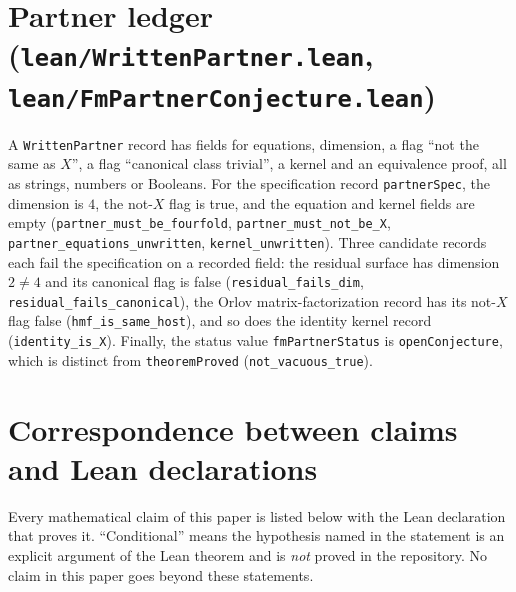 \documentclass[11pt]{amsart}
\theoremstyle{definition}
\theoremstyle{remark}
\begin{document}
\section{Partner ledger (\texttt{lean/WrittenPartner.lean}, \texttt{lean/FmPartnerConjecture.lean})}
A \texttt{WrittenPartner} record has fields for equations, dimension, a flag ``not the same as $X$'', a flag ``canonical class trivial'', a kernel and an equivalence proof, all as strings, numbers or Booleans. For the specification record \texttt{partnerSpec}, the dimension is $4$, the not-$X$ flag is true, and the equation and kernel fields are empty (\texttt{partner\_must\_be\_fourfold}, \texttt{partner\_must\_not\_be\_X}, \texttt{partner\_equations\_unwritten}, \texttt{kernel\_unwritten}). Three candidate records each fail the specification on a recorded field: the residual surface has dimension $2\ne4$ and its canonical flag is false (\texttt{residual\_fails\_dim}, \texttt{residual\_fails\_canonical}), the Orlov matrix-factorization record has its not-$X$ flag false (\texttt{hmf\_is\_same\_host}), and so does the identity kernel record (\texttt{identity\_is\_X}). Finally, the status value \texttt{fmPartnerStatus} is \texttt{openConjecture}, which is distinct from \texttt{theoremProved} (\texttt{not\_vacuous\_true}).

\section{Correspondence between claims and Lean declarations}\label{sec:table}
Every mathematical claim of this paper is listed below with the Lean declaration that proves it. ``Conditional'' means the hypothesis named in the statement is an explicit argument of the Lean theorem and is \emph{not} proved in the repository. No claim in this paper goes beyond these statements.
\end{document}
